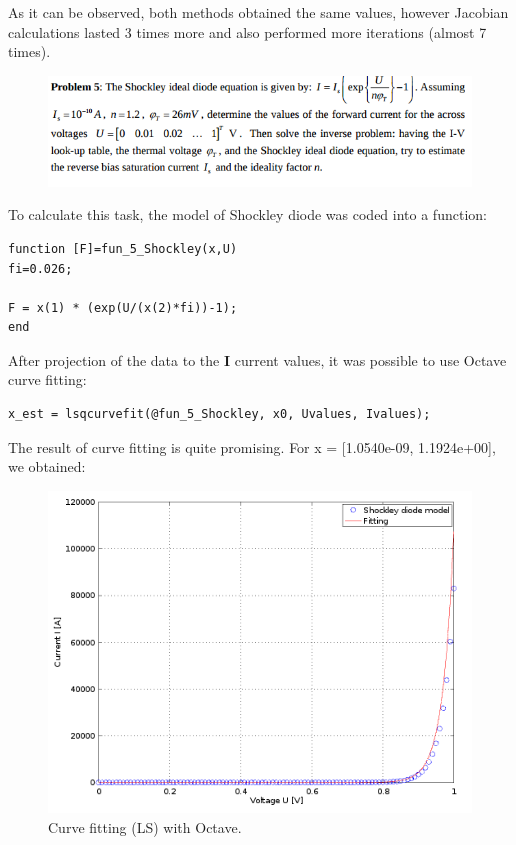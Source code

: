 \documentclass[eng,openany]{mgr}
\begin{document}
As it can be observed, both methods obtained the same values, however Jacobian calculations lasted 3 times more and also performed more iterations (almost 7 times).

\clearpage


\begin{figure}[h]
\centering
\includegraphics[width=0.7\linewidth]{screenshot008}
\label{fig:screenshot008}
\end{figure}

To calculate this task, the model of Shockley diode was coded into a function:
\begin{lstlisting}
function [F]=fun_5_Shockley(x,U)
fi=0.026;

F = x(1) * (exp(U/(x(2)*fi))-1); 
end
\end{lstlisting}


After projection of the data to the \textbf{I} current values, it was possible to use Octave curve fitting:
\begin{lstlisting}
x_est = lsqcurvefit(@fun_5_Shockley, x0, Uvalues, Ivalues);
\end{lstlisting}
The result of curve fitting is quite promising. For x = [1.0540e-09, 1.1924e+00], we obtained:
\begin{figure}[h]
\centering
\includegraphics[width=0.9\linewidth]{screenshot009}
\caption{Curve fitting (LS) with Octave.}
\label{fig:screenshot009}
\end{figure}
\end{document}
